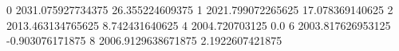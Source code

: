 0 2031.075927734375 26.355224609375
1 2021.799072265625 17.078369140625
2 2013.463134765625 8.742431640625
4 2004.720703125 0.0
6 2003.817626953125 -0.903076171875
8 2006.9129638671875 2.1922607421875
